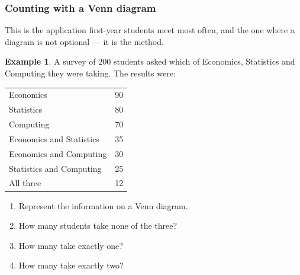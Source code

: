 \documentclass[11pt,a4paper]{article}
\theoremstyle{definition}
\newtheorem{example}[thm]{Example}
\begin{document}
\subsubsection{Counting with a Venn diagram}

This is the application first-year students meet most often, and the one where a
diagram is not optional --- it is the method.

\begin{example}
A survey of $200$ students asked which of Economics, Statistics and Computing they
were taking. The results were:
\begin{table}[H]
\centering
\begin{tabular}{|l|c|}
\hline
Economics & 90\\
Statistics & 80\\
Computing & 70\\
Economics and Statistics & 35\\
Economics and Computing & 30\\
Statistics and Computing & 25\\
All three & 12\\
\hline
\end{tabular}
\end{table}
\begin{enumerate}
\item[(a).] Represent the information on a Venn diagram.
\item[(b).] How many students take none of the three?
\item[(c).] How many take exactly one?
\item[(d).] How many take exactly two?
\end{enumerate}
\end{example}
\end{document}
